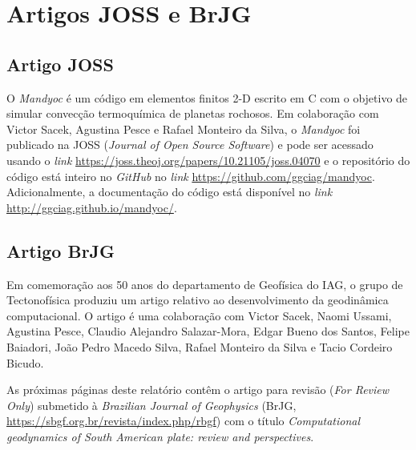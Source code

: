 \chapter{Artigos JOSS e BrJG}
\label{cha:artigos}

\section{Artigo JOSS}

O \textit{Mandyoc} é um código em elementos finitos 2-D escrito em C com o objetivo de simular convecção termoquímica de planetas rochosos. Em colaboração com Victor Sacek, Agustina Pesce e Rafael Monteiro da Silva, o \textit{Mandyoc} foi publicado na JOSS (\textit{Journal of Open Source Software}) e pode ser acessado usando o \textit{link} \url{https://joss.theoj.org/papers/10.21105/joss.04070} e o repositório do código está inteiro no \textit{GitHub} no \textit{link} \url{https://github.com/ggciag/mandyoc}. Adicionalmente, a documentação do código está disponível no \textit{link} \url{http://ggciag.github.io/mandyoc/}.

\section{Artigo BrJG}

Em comemoração aos 50 anos do departamento de Geofísica do IAG, o grupo de Tectonofísica produziu um artigo relativo ao desenvolvimento da geodinâmica computacional. O artigo é uma colaboração com Victor Sacek, Naomi Ussami, Agustina Pesce, Claudio Alejandro Salazar-Mora, Edgar Bueno dos Santos, Felipe Baiadori, João Pedro Macedo Silva, Rafael Monteiro da Silva e Tacio Cordeiro Bicudo.

As próximas páginas deste relatório contêm o artigo para revisão (\textit{For Review Only}) submetido à \textit{Brazilian Journal of Geophysics} (BrJG, \url{https://sbgf.org.br/revista/index.php/rbgf}) com o título \textit{Computational geodynamics of South American plate: review and perspectives}.




